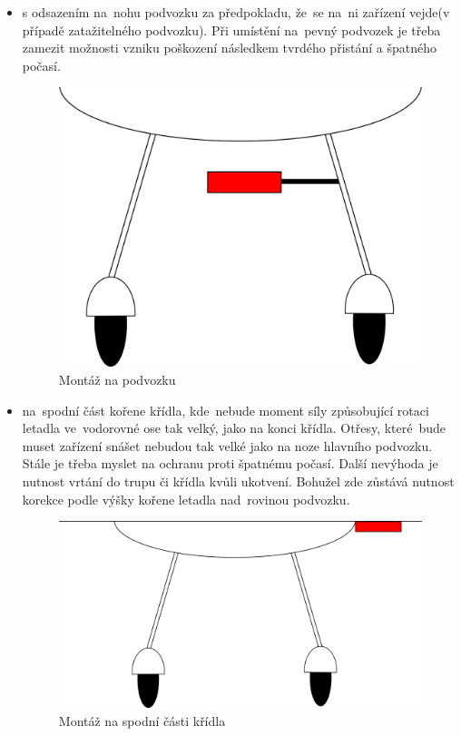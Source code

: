 		\begin{itemize}
			\item s odsazením na~nohu podvozku za předpokladu, že~se na~ni zařízení vejde(v případě zatažitelného podvozku). Při umístění na~pevný podvozek je třeba zamezit možnosti vzniku poškození následkem tvrdého přistání a špatného počasí. 
			
			\begin{figure}[H]
				\begin{center}
					\includegraphics[scale=0.5]{obrazky-figures/umisteni_na_podvozku.png}
					\caption{Montáž na podvozku}
					\label{navrh::umisteni_podvozek}
				\end{center}
			\end{figure}
			
			\item na~spodní část kořene křídla, kde~nebude moment síly způsobující rotaci letadla ve~vodorovné ose tak velký, jako na konci křídla. Otřesy, které~bude muset zařízení snášet nebudou tak velké jako na noze hlavního podvozku. Stále je třeba myslet na ochranu proti špatnému počasí. Další nevýhoda je nutnost vrtání do trupu či křídla kvůli ukotvení. Bohužel zde zůstává nutnost korekce podle výšky kořene letadla nad~rovinou podvozku.
			
			\begin{figure}[H]
				\begin{center}
					\includegraphics[scale=0.5]{obrazky-figures/umisteni_na_kridle.png}
					\caption{Montáž na spodní části křídla}
					\label{navrh::umisteni_kridlo}
				\end{center}
			\end{figure}
			

\end{itemize}
